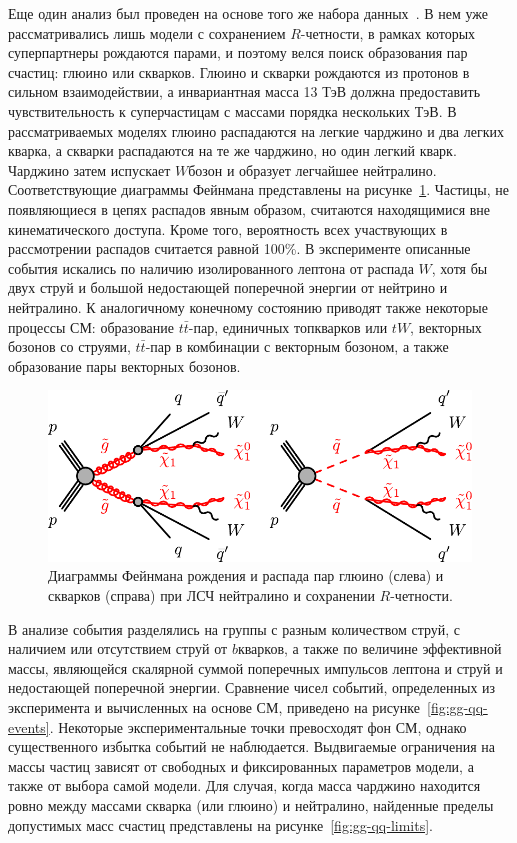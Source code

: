 \documentclass[a4paper, 10pt, twocolumn]{article}
\begin{document}

Еще один анализ был проведен на основе того же набора 
данных~\cite{ATLAS-CONF-2020-047}. В нем уже рассматривались лишь 
модели с сохранением $R$-четности, в рамках которых суперпартнеры 
рождаются парами, и поэтому велся поиск образования пар счастиц: глюино 
или скварков. Глюино и скварки рождаются из протонов в сильном 
взаимодействии, а инвариантная масса 13 ТэВ должна предоставить 
чувствительность к суперчастицам с массами порядка нескольких ТэВ. 
В рассматриваемых моделях глюино распадаются на легкие чарджино и два 
легких кварка, а скварки распадаются на те же чарджино, но один легкий 
кварк. Чарджино затем испускает $W$бозон 
и образует легчайшее нейтралино. Соответствующие диаграммы Фейнмана 
представлены на рисунке~\ref{fig:gg-qq}. Частицы, не появляющиеся 
в цепях распадов явным образом, считаются находящимися вне 
кинематического доступа. Кроме того, вероятность всех участвующих 
в рассмотрении распадов считается равной 100\%. В эксперименте 
описанные события искались по наличию изолированного лептона от распада 
$W$, хотя бы двух струй и большой недостающей поперечной энергии от 
нейтрино и нейтралино. К аналогичному конечному состоянию приводят 
также некоторые процессы СМ: образование $t\bar{t}$-пар, единичных 
топкварков или $tW$, векторных бозонов со струями, 
$t\bar{t}$-пар в комбинации с векторным бозоном, а также образование 
пары векторных бозонов.

\begin{figure}%
	\centering
	\includegraphics[width=\linewidth]{figures/gg-qq-Feynman}
	\caption{Диаграммы Фейнмана рождения и распада пар глюино (слева) 
	и скварков (справа) при ЛСЧ нейтралино и сохранении $R$-четности.}
	\label{fig:gg-qq}
\end{figure}%

В анализе события разделялись на группы с разным количеством струй, 
с наличием или отсутствием струй от $b$кварков, 
а также по величине эффективной массы, являющейся скалярной суммой 
поперечных импульсов лептона и струй и недостающей поперечной энергии. 
Сравнение чисел событий, определенных из эксперимента и вычисленных на 
основе СМ, приведено на рисунке~\ref{fig:gg-qq-events}. Некоторые 
экспериментальные точки превосходят фон СМ, однако существенного 
избытка событий не наблюдается. Выдвигаемые ограничения на массы 
частиц зависят от свободных и фиксированных параметров модели, а также 
от выбора самой модели. Для случая, когда масса чарджино находится 
ровно между массами скварка (или глюино) и нейтралино, найденные 
пределы допустимых масс счастиц представлены на 
рисунке~\ref{fig:gg-qq-limits}.
\end{document}
